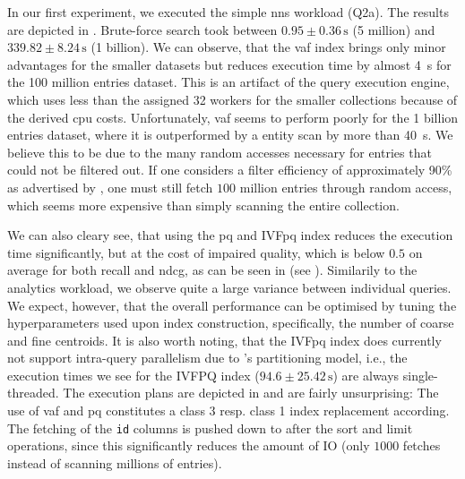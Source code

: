 In our first experiment, we executed the simple \acrshort{nns} workload (Q2a). The results are depicted in . Brute-force search took between $0.95 \pm 0.36 \, \si{\second}$ (5 million) and $339.82 \pm 8.24 \, \si{\second}$ (1 billion). We can observe, that the \acrshort{vaf} index brings only minor advantages for the smaller datasets but reduces execution time by almost \SI{4}{\second} for the 100 million entries dataset. This is an artifact of the query execution engine, which uses less than the assigned 32 workers for the smaller collections because of the derived \acrshort{cpu} costs. Unfortunately, \acrshort{vaf} seems to perform poorly for the 1 billion entries dataset, where it is outperformed by a entity scan by more than \SI{40}{\second}. We believe this to be due to the many random accesses necessary for entries that could not be filtered out. If one considers a filter efficiency of approximately 90\% as advertised by \cite{Weber:1998Va}, one must still fetch $100$ million entries through random access, which seems more expensive than simply scanning the entire collection.

We can also cleary see, that using the \acrshort{pq} and IVF\acrshort{pq} index reduces the execution time significantly, but at the cost of impaired quality, which is below $0.5$ on average for both recall and n\acrshort{dcg}, as can be seen in  (see ). Similarily to the analytics workload, we observe quite a large variance between individual queries. We expect, however, that the overall performance can be optimised by tuning the hyperparameters used upon index construction, specifically, the number of coarse and fine centroids. It is also worth noting, that the IVF\acrshort{pq} index does currently not support intra-query parallelism due to \cottontail{}'s partitioning model, i.e., the execution times we see for the IVFPQ index ($94.6 \pm 25.42 \, \si{\second}$) are always single-threaded. The execution plans are depicted in  and are fairly unsurprising: The use of \acrshort{vaf} and \acrshort{pq} constitutes a class 3 resp. class 1 index replacement according. The fetching of the \texttt{id} columns is pushed down to after the sort and limit operations, since this significantly reduces the amount of IO (only $1000$ fetches instead of scanning millions of entries).


